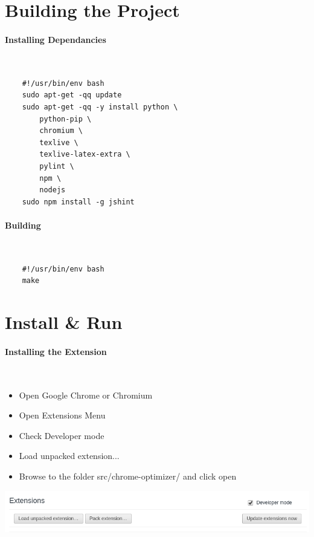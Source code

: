 \documentclass{article}
\begin{document}
\pagebreak

\section{Building the Project}
\paragraph{Installing Dependancies}\mbox{}\\
\begin{tcolorbox}[title=install-deps.sh]
  \begin{verbatim}
    #!/usr/bin/env bash
    sudo apt-get -qq update
    sudo apt-get -qq -y install python \
        python-pip \
        chromium \
        texlive \
        texlive-latex-extra \
        pylint \
        npm \
        nodejs
    sudo npm install -g jshint
  \end{verbatim}
\end{tcolorbox}
\paragraph{Building}\mbox{}\\
\begin{tcolorbox}[title=build.sh]
  \begin{verbatim}
    #!/usr/bin/env bash
    make
  \end{verbatim}
\end{tcolorbox}

\section{Install \& Run}
\paragraph{Installing the Extension}\mbox{}\\
\begin{itemize}
\item Open Google Chrome or Chromium
\item Open Extensions Menu
\item Check Developer mode
\item Load unpacked extension...
\item Browse to the folder src/chrome-optimizer/ and click open
\end{itemize}
\begin{center}
  \includegraphics[scale=0.5]{install_extension}
\end{center}
\end{document}
